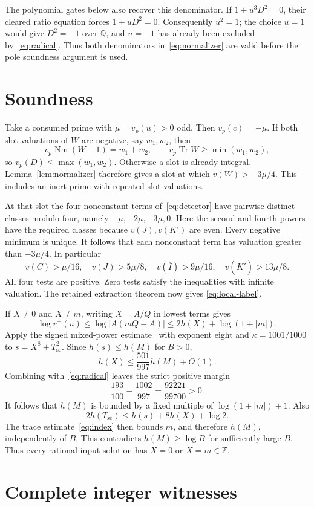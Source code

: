 \documentclass[11pt,a4paper]{article}
\newcommand{\Q}{\mathbb Q}\newcommand{\Z}{\mathbb Z}
\DeclareMathOperator{\Tr}{Tr}\DeclareMathOperator{\Nm}{Nm}
\begin{document}
The polynomial gates below also recover this denominator. If
$1+u^3D^2=0$, their cleared ratio equation forces $1+uD^2=0$.
Consequently $u^2=1$; the choice $u=1$ would give $D^2=-1$ over
$\Q$, and $u=-1$ has already been excluded by~\eqref{eq:radical}.
Thus both denominators in~\eqref{eq:normalizer} are valid before the
pole soundness argument is used.

\section{Soundness}

Take a consumed prime with $\mu=v_p(u)>0$ odd. Then $v_p(c)=-\mu$.
If both slot valuations of $W$ are negative, say $w_1,w_2$, then
\[
 v_p\Nm(W-1)=w_1+w_2,\qquad
 v_p\Tr W\ge\min(w_1,w_2),
\]
so $v_p(D)\le\max(w_1,w_2)$. Otherwise a slot is already integral.
Lemma~\ref{lem:normalizer} therefore gives a slot at which
$v(W)>-3\mu/4$. This includes an inert prime with repeated slot
valuations.

At that slot the four nonconstant terms of~\eqref{eq:detector} have
pairwise distinct classes modulo four, namely $-\mu,-2\mu,-3\mu,0$.
Here the second and fourth powers have the required classes because
$v(J),v(K')$ are even. Every negative minimum is unique. It follows
that each nonconstant term has valuation greater than $-3\mu/4$.
In particular
\[
 v(C)>\mu/16,\quad v(J)>5\mu/8,\quad
 v(\overline I)>9\mu/16,\quad v(\overline{K'})>13\mu/8.
\]
All four tests are positive. Zero tests satisfy the inequalities with
infinite valuation. The retained extraction theorem now gives
\eqref{eq:local-label}.

If $X\ne0$ and $X\ne m$, writing $X=A/Q$ in lowest terms gives
\[
 \log r^+(u)\le\log|A(mQ-A)|
             \le2h(X)+\log(1+|m|).
\]
Apply the signed mixed-power estimate~\cite{v58} with exponent eight
and $\kappa=1001/1000$ to $s=X^8+T_{\mathrm{sc}}^2$. Since
$h(s)\le h(M)$ for $B>0$,
\[
 h(X)\le\frac{501}{997}h(M)+O(1).
\]
Combining with~\eqref{eq:radical} leaves the strict positive margin
\[
 \frac{193}{100}-\frac{1002}{997}
                       =\frac{92221}{99700}>0.
\]
It follows that $h(M)$ is bounded by a fixed multiple of
$\log(1+|m|)+1$. Also
\[
 2h(T_{\mathrm{sc}})\le h(s)+8h(X)+\log2.
\]
The trace estimate~\eqref{eq:index} then bounds $m$, and therefore
$h(M)$, independently of $B$. This contradicts $h(M)\ge\log B$
for sufficiently large $B$. Thus every rational input solution has
$X=0$ or $X=m\in\Z$.

\section{Complete integer witnesses}
\end{document}
